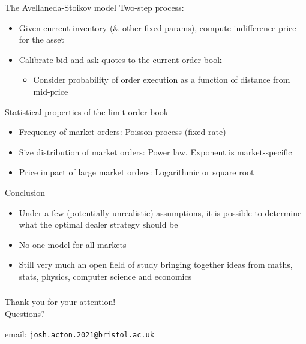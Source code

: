 \documentclass{beamer} %
\begin{document}
\begin{frame}{The Avellaneda-Stoikov model}
    Two-step process:
    \begin{itemize}
        \item Given current inventory (\& other fixed params), compute indifference price for the asset
        \item Calibrate bid and ask quotes to the current order book
        \begin{itemize}
            \item Consider probability of order execution as a function of distance from mid-price
        \end{itemize}
    \end{itemize}
\end{frame}

\begin{frame}{Statistical properties of the limit order book}
    \begin{itemize}
        \item Frequency of market orders: Poisson process (fixed rate)
        \item Size distribution of market orders: Power law. Exponent is market-specific
        \item Price impact of large market orders: Logarithmic or square root
    \end{itemize}
\end{frame}

\begin{frame}{Conclusion}
    \begin{itemize}
        \item Under a few (potentially unrealistic) assumptions, it is
        possible to determine what the optimal dealer strategy should be
        \item No one model for all markets
        \item Still very much an open field of study bringing together ideas
        from maths, stats, physics, computer science and economics
    \end{itemize}
\end{frame}

\begin{frame}
    \frametitle{}
    \begin{center}
        \large{Thank you for your attention!}\\
        \vspace{1cm}
        Questions?
        \vspace{2cm}

        email: \texttt{josh.acton.2021@bristol.ac.uk}
    \end{center}
\end{frame}
\end{document}

